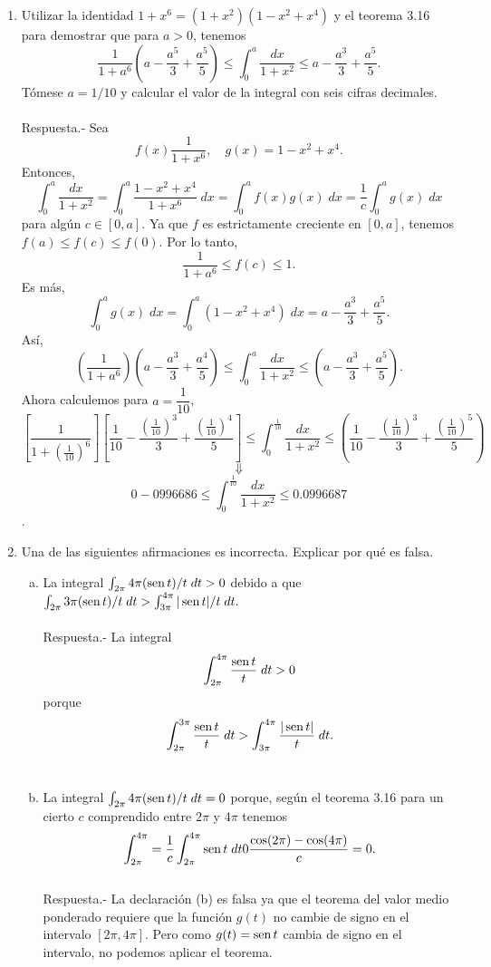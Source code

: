 \begin{enumerate}[\bfseries 1.]
    \item Utilizar la identidad $1+x^6=(1+x^2)(1-x^2+x^4)$ y el teorema 3.16 para demostrar que para $a>0$, tenemos
    $$\dfrac{1}{1+a^6}\left(a-\dfrac{a^5}{3}+\dfrac{a^5}{5}\right)\leq \int_0^a \dfrac{dx}{1+x^2}\leq a -\dfrac{a^3}{3}+\dfrac{a^5}{5}.$$
    Tómese $a=1/10$ y calcular el valor de la integral con seis cifras decimales.\\\\
	Respuesta.-\; Sea
	$$f(x)\dfrac{1}{1+x^6},\quad g(x)=1-x^2+x^4.$$
	Entonces,
	$$\int_0^a \dfrac{dx}{1+x^2}=\int_0^a \dfrac{1-x^2+x^4}{1+x^6}\; dx = \int_0^a f(x) g(x)\; dx = \dfrac{1}{c}\int_0^a g(x)\; dx$$
	para algún $c\in [0,a].$ Ya que $f$ es estrictamente creciente en $[0,a]$, tenemos $f(a)\leq f(c)\leq f(0)$. Por lo tanto,
	$$\dfrac{1}{1+a^6}\leq f(c)\leq 1.$$
	Es más,
	$$\int_0^a g(x)\; dx = \int_0^a (1-x^2+x^4)\; dx = a-\dfrac{a^3}{3}+\dfrac{a^5}{5}.$$
	Así,
	$$\left(\dfrac{1}{1+a^6}\right)\left(a-\dfrac{a^3}{3}+\dfrac{a^4}{5}\right)\leq \int_0^a \dfrac{dx}{1+x^2}\leq \left(a-\dfrac{a^3}{3}+\dfrac{a^5}{5}\right).$$
	Ahora calculemos para $a=\dfrac{1}{10}$,
	$$\left[\dfrac{1}{1+(\frac{1}{10})^6}\right]\left[\dfrac{1}{10}-\dfrac{(\frac{1}{10})^3}{3}+\dfrac{(\frac{1}{10})^4}{5}\right]\leq \int_0^{\frac{1}{10}} \dfrac{dx}{1+x^2}\leq \left(\dfrac{1}{10}-\dfrac{(\frac{1}{10})^3}{3}+\dfrac{(\frac{1}{10})^5}{5}\right)$$ $$\Downarrow$$ $$ 0-0996686\leq \int_0^{\frac{1}{10}}\dfrac{dx}{1+x^2}\leq 0.0996687$$.

    \item Una de las siguientes afirmaciones es incorrecta. Explicar por qué es falsa.

	\begin{enumerate}[a)]

	    \item La integral $\int_{2\pi}{4\pi}(\mathop{\mbox{\normalfont sen}}\nolimits t)/t \; dt > 0$ debido a que $\int_{2\pi}{3\pi} (\mathop{\mbox{\normalfont sen}}\nolimits t)/t\; dt>\int_{3\pi}^{4\pi}|\mathop{\mbox{\normalfont sen}}\nolimits t|/t\; dt.$\\\\
		Respuesta.-\; La integral $$\int_{2\pi}^{4\pi}\dfrac{\mathop{\mbox{\normalfont sen}}\nolimits t}{t}\; dt > 0$$
		porque $$\int_{2\pi}^{3\pi}\dfrac{\mathop{\mbox{\normalfont sen}}\nolimits t}{t}\; dt>\int_{3\pi}^{4\pi}\dfrac{|\mathop{\mbox{\normalfont sen}}\nolimits t|}{t}\; dt.$$\\

	    \item La integral $\int_{2\pi}{4\pi}(\mathop{\mbox{\normalfont sen}}\nolimits t)/t \; dt = 0$ porque, según el teorema 3.16 para un cierto $c$ comprendido entre $2\pi$ y $4\pi$ tenemos
		$$\int_{2\pi}^{4\pi}=\dfrac{1}{c}\int_{2\pi}^{4\pi}\mathop{\mbox{\normalfont sen}}\nolimits t \; dt0\dfrac{\cos(2\pi)-\cos(4\pi)}{c}=0.$$\\
		Respuesta.-\; La declaración (b) es falsa ya que el teorema del valor medio ponderado requiere que la función $g(t)$ no cambie de signo en el intervalo $[2 \pi, 4 \pi]$. Pero como $g(t) = \mathop{\mbox{\normalfont sen}}\nolimits t$ cambia de signo en el intervalo, no podemos aplicar el teorema.\\\\


\end{enumerate}
\end{enumerate}
